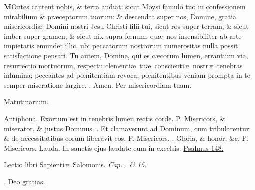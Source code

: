 \documentclass[letter,11pt]{book}
\makeatletter
\DeclareRobustCommand{\Vbar}{\vers@resp{-0.1em}{V}}
\DeclareRobustCommand{\Rbar}{\vers@resp{0pt}{R}}
\newcommand{\vers@resp@sym}{\raisebox{0.2ex}{\rotatebox[origin=c]{-20}{$\m@th\rceil$}}}
\newcommand{\vers@resp}[2]{%
  {\ooalign{\hidewidth\kern#1\vers@resp@sym\hidewidth\cr#2\cr}}%
}%
\def\P{\color{Red} P. \color{black}}
\def\V{\color{Red} \Vbar . \color{black}}
\def\R{\color{Red} \Rbar . \color{black}}
\makeatother
\begin{document}
\begin{multicols*}{2}
\lettrine[lines=2]{\bfseries \color{Red} M}{}Ontes cantent nobis, \& terra audiat; sicut Moysi famulo tuo in confessionem mirabilium \& pr\ae ceptorum tuorum: \& descendat super nos, Domine, gratia misericordi\ae \ Domini nostri Jesu Christi filii tui, sicut ros super terram, \& sicut imber super gramen, \& sicut nix supra f\oe num: qu\ae \ nos
insensibiliter ab arte impietatis emundet illic, ubi peccatorum nostrorum numerositas nulla possit satisfactione pensari. Tu autem, Domine, qui es c\ae corum lumen, errantium via, resurrectio mortuorum, respectu clementi\ae \ tu\ae \ conscienti\ae \ nostr\ae \ tenebras inlumina; peccantes ad p\oe nitentiam revoca, p\oe nitentibus veniam prompta in te semper miseratione largire. \R Amen. Per misericordiam tuam.
\vspace{-.5em} \begin{center} \color{Red} Matutinarium. \color{black} \end{center} \vspace{-.5em}
\par \noindent \color{Red} Antiphona. \color{black} Exortum est in tenebris lumen rectis corde. \P Misericors, \& miserator, \& justus Dominus. \V Et clamaverunt ad Dominum, cum tribularentur: \& de necessitatibus eorum liberavit eos. \P Misericors. \V Gloria, \& honor, \&c. \P Misericors.
\newline \color{Red} Lauda. \color{black} In sanctis ejus laudate eum in excelsis. \color{Red} \hyperlink{ps148}{Psalmus 148.} \color{black}
\vspace{-.5em} \begin{center} {\color{Red} L}ectio libri Sapienti\ae \ Salomonis. \itshape Cap. . {\itshape \&} 15. \color{black} \end{center} \vspace{-.5em}
\par \noindent \R Deo gratias.

\end{multicols*}
\end{document}
